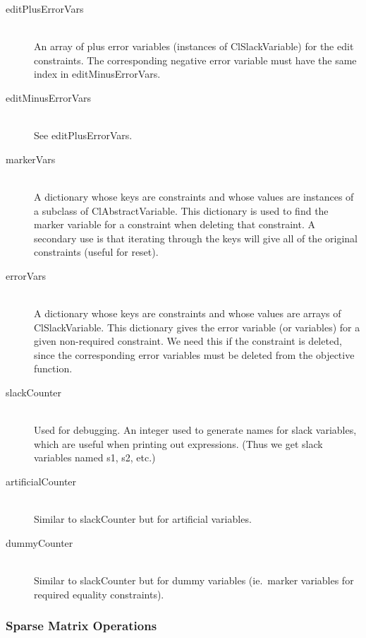 \documentclass{article}
\begin{document}
\begin{description}
\item[{\sf editPlusErrorVars}] \ \\
An array of plus error variables (instances
of {\sf ClSlackVariable}) for the edit constraints.  The corresponding
negative error variable must have the same index in {\sf editMinusErrorVars}.

\item[{\sf editMinusErrorVars}] \ \\
See {\sf editPlusErrorVars}.

\item[{\sf markerVars}] \ \\
A dictionary whose keys are constraints and whose
values are instances of a subclass of {\sf ClAbstractVariable}.  This
dictionary is used to find the marker variable for a constraint when
deleting that constraint.  A secondary use is that iterating through the
keys will give all of the original constraints (useful for {\sf reset}).

\item[{\sf errorVars}] \ \\
A dictionary whose keys are constraints and whose
values are arrays of {\sf ClSlackVariable}.  This dictionary gives the
error variable (or variables) for a given non-required constraint.  We need
this if the constraint is deleted, since the corresponding error variables
must be deleted from the objective function.

\item[{\sf slackCounter}] \ \\
Used for debugging.  An integer used to generate
names for slack variables, which are useful when printing out expressions.
(Thus we get slack variables named {\sf s1}, {\sf s2}, etc.)

\item[{\sf artificialCounter}] \ \\
Similar to {\sf slackCounter} but for
artificial variables.

\item[{\sf dummyCounter}]  \ \\
Similar to {\sf slackCounter} but for
dummy variables (ie.\ marker variables for required equality constraints).

\end{description}

\subsubsection{Sparse Matrix Operations}
\end{document}
